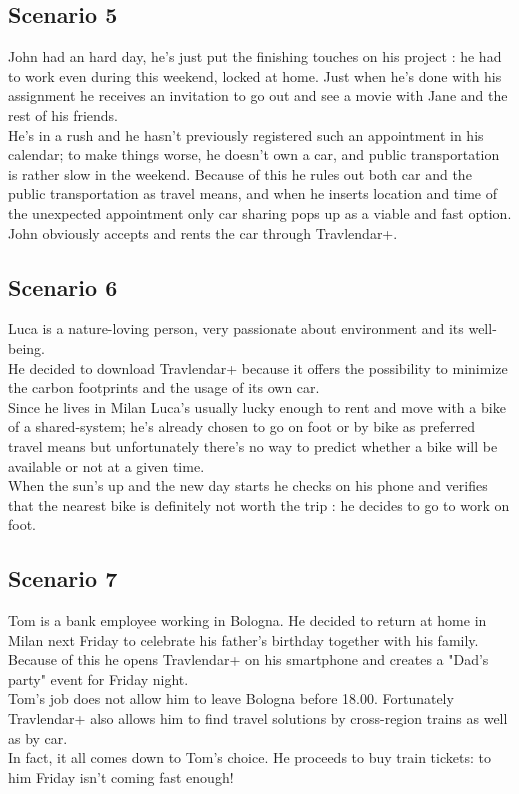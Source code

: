 \subsection {Scenario 5}
John had an hard day, he’s just put the finishing touches on his project : he had to work even during this weekend, locked at home. Just when he’s done with his assignment he receives an invitation to go out and see a movie with Jane and the rest of his friends.\\
He’s in a rush and he hasn’t previously registered such an appointment in his calendar; to make things worse, he doesn’t own a car, and public transportation is rather slow in the weekend. Because of this he rules out both car and the public transportation as travel means, and when he inserts location and time of the unexpected appointment only car sharing pops up as a viable and fast option.\\ 
John obviously accepts and rents the car through Travlendar+. 

\subsection {Scenario 6}

Luca is a nature-loving person, very passionate about environment and its well-being.\\
He decided to download Travlendar+ because it offers the possibility to minimize the carbon footprints and the usage of its own car.\\
Since he lives in Milan Luca’s usually lucky enough to rent and move with a bike of a shared-system; he’s already chosen to go on foot or by bike as preferred travel means but unfortunately there’s no way to predict whether a bike will be available or not at a given time.\\
When the sun’s up and the new day starts he checks on his phone and verifies that the nearest bike is definitely not worth the trip : he decides to go to work on foot.


\subsection{Scenario 7}

Tom is a bank employee working in Bologna. He decided to return at home in Milan next Friday to celebrate his father's birthday together with his family.\\
Because of this he opens Travlendar+ on his smartphone and creates a "Dad's party" event for Friday night.\\
Tom’s job does not allow him to leave Bologna before 18.00. Fortunately Travlendar+ also allows him to find travel solutions by cross-region trains as well as by car.\\
In fact, it all comes down to Tom's choice. He proceeds to buy train tickets: to him Friday isn’t coming fast enough!
